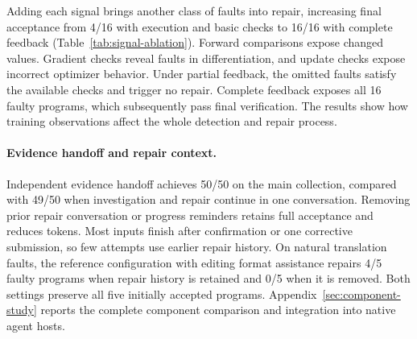 \begin{table}[!htb]
\caption{Effect of training signal coverage on detection and repair. Accepted candidates pass final full verification. Faults passing the initial available checks trigger no repair.}
\label{tab:signal-ablation}
\centering
\small
\setlength{\tabcolsep}{4pt}

\end{table}

Adding each signal brings another class of faults into repair, increasing final acceptance from 4/16 with execution and basic checks to 16/16 with complete feedback (Table~\ref{tab:signal-ablation}). Forward comparisons expose changed values. Gradient checks reveal faults in differentiation, and update checks expose incorrect optimizer behavior. Under partial feedback, the omitted faults satisfy the available checks and trigger no repair. Complete feedback exposes all 16 faulty programs, which subsequently pass final verification. The results show how training observations affect the whole detection and repair process.

\paragraph{Evidence handoff and repair context.}
Independent evidence handoff achieves 50/50 on the main collection, compared with 49/50 when investigation and repair continue in one conversation. Removing prior repair conversation or progress reminders retains full acceptance and reduces tokens. Most inputs finish after confirmation or one corrective submission, so few attempts use earlier repair history. On natural translation faults, the reference configuration with editing format assistance repairs 4/5 faulty programs when repair history is retained and 0/5 when it is removed. Both settings preserve all five initially accepted programs. Appendix~\ref{sec:component-study} reports the complete component comparison and integration into native agent hosts.
